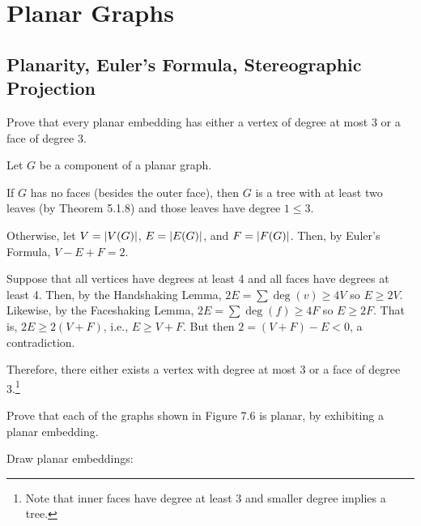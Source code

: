 \section{Planar Graphs}

\setcounter{subsection}{2}
\subsection{Planarity, Euler's Formula, Stereographic Projection}

\begin{xca}
  Prove that every planar embedding has either a vertex of degree at most 3
  or a face of degree 3.
\end{xca}
\begin{prf}
  Let $G$ be a component of a planar graph.

  If $G$ has no faces (besides the outer face),
  then $G$ is a tree with at least two leaves (by Theorem 5.1.8)
  and those leaves have degree $1 \leq 3$.

  Otherwise, let $V = \abs{V(G)}$,
  $E = \abs{E(G)}$, and $F = \abs{F(G)}$.
  Then, by Euler's Formula, $V - E + F = 2$.

  Suppose that all vertices have degrees at least 4
  and all faces have degrees at least 4.
  Then, by the Handshaking Lemma, $2E = \sum \deg(v) \geq 4V$ so $E \geq 2V$.
  Likewise, by the Faceshaking Lemma, $2E = \sum \deg(f) \geq 4F$ so $E \geq 2F$.
  That is, $2E \geq 2(V + F)$, i.e., $E \geq V + F$.
  But then $2 = (V + F) - E < 0$, a contradiction.

  Therefore, there either exists a vertex with degree at most 3
  or a face of degree 3.\footnote{Note that inner faces have degree at least 3
    and smaller degree implies a tree.}
\end{prf}

\begin{xca}
  Prove that each of the graphs shown in Figure 7.6 is planar,
  by exhibiting a planar embedding.
\end{xca}
\begin{sol}
  Draw planar embeddings:
  \quad
\end{sol}

